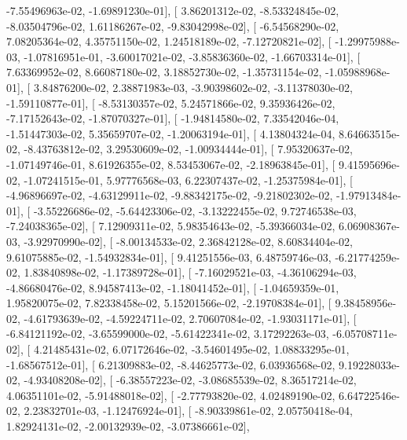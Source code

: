 \documentclass{article}
\begin{document}
         -7.55496963e-02,  -1.69891230e-01],
       [  3.86201312e-02,  -8.53324845e-02,  -8.03504796e-02,
          1.61186267e-02,  -9.83042998e-02],
       [ -6.54568290e-02,   7.08205364e-02,   4.35751150e-02,
          1.24518189e-02,  -7.12720821e-02],
       [ -1.29975988e-03,  -1.07816951e-01,  -3.60017021e-02,
         -3.85836360e-02,  -1.66703314e-01],
       [  7.63369952e-02,   8.66087180e-02,   3.18852730e-02,
         -1.35731154e-02,  -1.05988968e-01],
       [  3.84876200e-02,   2.38871983e-03,  -3.90398602e-02,
         -3.11378030e-02,  -1.59110877e-01],
       [ -8.53130357e-02,   5.24571866e-02,   9.35936426e-02,
         -7.17152643e-02,  -1.87070327e-01],
       [ -1.94814580e-02,   7.33542046e-04,  -1.51447303e-02,
          5.35659707e-02,  -1.20063194e-01],
       [  4.13804324e-04,   8.64663515e-02,  -8.43763812e-02,
          3.29530609e-02,  -1.00934444e-01],
       [  7.95320637e-02,  -1.07149746e-01,   8.61926355e-02,
          8.53453067e-02,  -2.18963845e-01],
       [  9.41595696e-02,  -1.07241515e-01,   5.97776568e-03,
          6.22307437e-02,  -1.25375984e-01],
       [ -4.96896697e-02,  -4.63129911e-02,  -9.88342175e-02,
         -9.21802302e-02,  -1.97913484e-01],
       [ -3.55226686e-02,  -5.64423306e-02,  -3.13222455e-02,
          9.72746538e-03,  -7.24038365e-02],
       [  7.12909311e-02,   5.98354643e-02,  -5.39366034e-02,
          6.06908367e-03,  -3.92970990e-02],
       [ -8.00134533e-02,   2.36842128e-02,   8.60834404e-02,
          9.61075885e-02,  -1.54932834e-01],
       [  9.41251556e-03,   6.48759746e-03,  -6.21774259e-02,
          1.83840898e-02,  -1.17389728e-01],
       [ -7.16029521e-03,  -4.36106294e-03,  -4.86680476e-02,
          8.94587413e-02,  -1.18041452e-01],
       [ -1.04659359e-01,   1.95820075e-02,   7.82338458e-02,
          5.15201566e-02,  -2.19708384e-01],
       [  9.38458956e-02,  -4.61793639e-02,  -4.59224711e-02,
          2.70607084e-02,  -1.93031171e-01],
       [ -6.84121192e-02,  -3.65599000e-02,  -5.61422341e-02,
          3.17292263e-03,  -6.05708711e-02],
       [  4.21485431e-02,   6.07172646e-02,  -3.54601495e-02,
          1.08833295e-01,  -1.68567512e-01],
       [  6.21309883e-02,  -8.44625773e-02,   6.03936568e-02,
          9.19228033e-02,  -4.93408208e-02],
       [ -6.38557223e-02,  -3.08685539e-02,   8.36517214e-02,
          4.06351101e-02,  -5.91488018e-02],
       [ -2.77793820e-02,   4.02489190e-02,   6.64722546e-02,
          2.23832701e-03,  -1.12476924e-01],
       [ -8.90339861e-02,   2.05750418e-04,   1.82924131e-02,
         -2.00132939e-02,  -3.07386661e-02],
\end{document}
